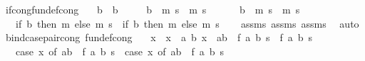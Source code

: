 \begin{isabellebody}
\isanewline
{}\isamarkupfalse%
\ if{\isacharunderscore}{\kern0pt}cong{\isacharbrackleft}{\kern0pt}fundef{\isacharunderscore}{\kern0pt}cong{\isacharbrackright}{\kern0pt}{\isacharcolon}{\kern0pt}\isanewline
\ \ \ {\isachardoublequoteopen}b\ {\isacharequal}{\kern0pt}\ b{\isacharprime}{\kern0pt}{\isachardoublequoteclose}\isanewline
\ \ \ \ \ {\isachardoublequoteopen}b{\isacharprime}{\kern0pt}\ {\isasymLongrightarrow}\ m{}\ s\ {\isacharequal}{\kern0pt}\ m{}{\isacharprime}{\kern0pt}\ s{\isachardoublequoteclose}\isanewline
\ \ \ \ \ {\isachardoublequoteopen}{\isasymnot}\ b{\isacharprime}{\kern0pt}\ {\isasymLongrightarrow}\ m{}\ s\ {\isacharequal}{\kern0pt}\ m{}{\isacharprime}{\kern0pt}\ s{\isachardoublequoteclose}\isanewline
\ \ \ {\isachardoublequoteopen}{\isacharparenleft}{\kern0pt}if\ b\ then\ m{}\ else\ m{}{\isacharparenright}{\kern0pt}\ s\ {\isacharequal}{\kern0pt}\ {\isacharparenleft}{\kern0pt}if\ b{\isacharprime}{\kern0pt}\ then\ m{}{\isacharprime}{\kern0pt}\ else\ m{}{\isacharprime}{\kern0pt}{\isacharparenright}{\kern0pt}\ s{\isachardoublequoteclose}\isanewline
%
\isadelimproof
\ \ %
\endisadelimproof
%
\isatagproof
{}\isamarkupfalse%
\ assms{\isacharparenleft}{\kern0pt}{}{\isacharparenright}{\kern0pt}\ assms{\isacharparenleft}{\kern0pt}{}{\isacharparenright}{\kern0pt}\ assms{\isacharparenleft}{\kern0pt}{}{\isacharparenright}{\kern0pt}\ \isamarkupfalse%
\ auto%
\endisatagproof
{\isafoldproof}%
%
\isadelimproof
\isanewline
%
\endisadelimproof
\isanewline
{}\isamarkupfalse%
\ bind{\isacharunderscore}{\kern0pt}case{\isacharunderscore}{\kern0pt}pair{\isacharunderscore}{\kern0pt}cong\ {\isacharbrackleft}{\kern0pt}fundef{\isacharunderscore}{\kern0pt}cong{\isacharbrackright}{\kern0pt}{\isacharcolon}{\kern0pt}\isanewline
\ \ \ {\isachardoublequoteopen}x\ {\isacharequal}{\kern0pt}\ x{\isacharprime}{\kern0pt}{\isachardoublequoteclose}\ \ {\isachardoublequoteopen}{\isasymAnd}a\ b{\isachardot}{\kern0pt}\ x\ {\isacharequal}{\kern0pt}\ {\isacharparenleft}{\kern0pt}a{\isacharcomma}{\kern0pt}b{\isacharparenright}{\kern0pt}\ {\isasymLongrightarrow}\ f\ a\ b\ s\ {\isacharequal}{\kern0pt}\ f{\isacharprime}{\kern0pt}\ a\ b\ s{\isachardoublequoteclose}\isanewline
\ \ \ {\isachardoublequoteopen}{\isacharparenleft}{\kern0pt}case\ x\ of\ {\isacharparenleft}{\kern0pt}a{\isacharcomma}{\kern0pt}b{\isacharparenright}{\kern0pt}\ {\isasymRightarrow}\ f\ a\ b{\isacharparenright}{\kern0pt}\ s\ {\isacharequal}{\kern0pt}\ {\isacharparenleft}{\kern0pt}case\ x{\isacharprime}{\kern0pt}\ of\ {\isacharparenleft}{\kern0pt}a{\isacharcomma}{\kern0pt}b{\isacharparenright}{\kern0pt}\ {\isasymRightarrow}\ f{\isacharprime}{\kern0pt}\ a\ b{\isacharparenright}{\kern0pt}\ s{\isachardoublequoteclose}\isanewline

\end{isabellebody}
